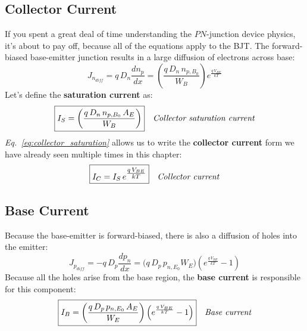 \subsection{Collector Current}
If you spent a great deal of time understanding the $PN$-junction device physics, it's about to pay off, because all of the equations apply to the BJT.  The forward-biased base-emitter junction results in a large diffusion of electrons across base:
    \begin{equation}
        J_{n_{diff}} = q\,D_n\frac{d{n_p}}{dx}
        = \left( \frac{q\,D_n\,n_{p,B_0}}{W_B} \right) e^{\frac{q\,V_{BE}}{kT}}
    \end{equation}
Let's define the \textbf{saturation current} as:
    \begin{align}
        \Aboxed{I_S &= \left(\frac{q\,D_n\,n_{p,B_0}\,A_E}{W_B}\right)} &\textit{Collector saturation current}
        \label{eq:collector_saturation}
    \end{align}
\emph{Eq.~\ref{eq:collector_saturation}} allows us to write the \textbf{collector current} form we have already seen multiple times in this chapter:
    \begin{align}
        \Aboxed{I_C &= I_S\,e^{\mathlarger{\frac{q\,V_{BE}}{kT}}}} &\textit{Collector current}
    \end{align}
\subsection{Base Current}
Because the base-emitter is forward-biased, there is also a diffusion of holes into the emitter:
    \begin{equation}
        J_{p_{diff}} = -q\,D_p\frac{d{p_n}}{dx}
        = \bigg({q\,D_p\,p_{n,E_0}}{W_E}\bigg) \left(e^{\frac{q\,V_{BE}}{kT}} - 1\right)
    \end{equation}
Because all the holes arise from the base region, the \textbf{base current} is responsible for this component:
    \begin{align}
        \Aboxed{I_B &= \bigg(\frac{q\,D_p\,p_{n,E_0}\,A_E}{W_E}\bigg) \left(e^{\frac{q\,V_{BE}}{kT}} - 1\right)}
        &\textit{Base current}
        \label{eq:base_current}
    \end{align}
